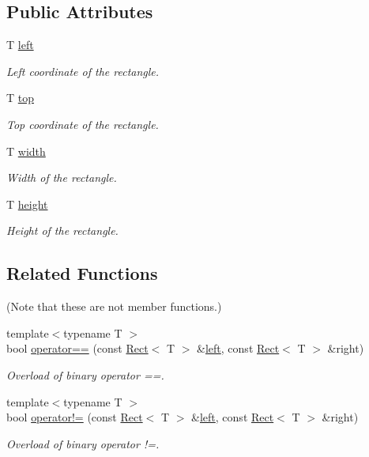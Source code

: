 \subsection*{Public Attributes}
\begin{DoxyCompactItemize}
\item 
T \hyperlink{classsf_1_1_rect_aa49960fa465103d9cb7069ceb25c7c32}{left}
\begin{DoxyCompactList}\small\item\em Left coordinate of the rectangle. \end{DoxyCompactList}\item 
T \hyperlink{classsf_1_1_rect_abd3d3a2d0ad211ef0082bd0aa1a5c0e3}{top}
\begin{DoxyCompactList}\small\item\em Top coordinate of the rectangle. \end{DoxyCompactList}\item 
T \hyperlink{classsf_1_1_rect_a4dd5b9d4333bebbc51bd309298fd500f}{width}
\begin{DoxyCompactList}\small\item\em Width of the rectangle. \end{DoxyCompactList}\item 
T \hyperlink{classsf_1_1_rect_a6fa0fc7de1636d78cae1a1b54eef95cd}{height}
\begin{DoxyCompactList}\small\item\em Height of the rectangle. \end{DoxyCompactList}\end{DoxyCompactItemize}
\subsection*{Related Functions}
(Note that these are not member functions.) \begin{DoxyCompactItemize}
\item 
{\footnotesize template$<$typename T $>$ }\\bool \hyperlink{classsf_1_1_rect_ab3488b5dbd0e587c4d7cb80605affc46}{operator==} (const \hyperlink{classsf_1_1_rect}{Rect}$<$ T $>$ \&\hyperlink{classsf_1_1_rect_aa49960fa465103d9cb7069ceb25c7c32}{left}, const \hyperlink{classsf_1_1_rect}{Rect}$<$ T $>$ \&right)
\begin{DoxyCompactList}\small\item\em Overload of binary operator ==. \end{DoxyCompactList}\item 
{\footnotesize template$<$typename T $>$ }\\bool \hyperlink{classsf_1_1_rect_a03fc4c105687b7d0f07b6b4ed4b45581}{operator!=} (const \hyperlink{classsf_1_1_rect}{Rect}$<$ T $>$ \&\hyperlink{classsf_1_1_rect_aa49960fa465103d9cb7069ceb25c7c32}{left}, const \hyperlink{classsf_1_1_rect}{Rect}$<$ T $>$ \&right)
\begin{DoxyCompactList}\small\item\em Overload of binary operator !=. \end{DoxyCompactList}\end{DoxyCompactItemize}


